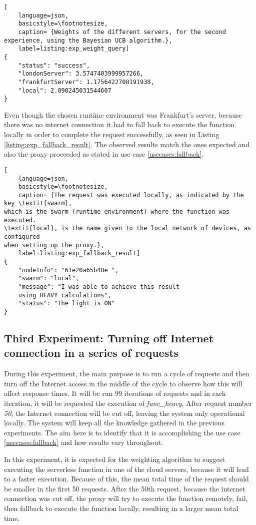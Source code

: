 \begin{lstlisting}[
    language=json,
    basicstyle=\footnotesize,
    caption= {Weights of the different servers, for the second experience, using the Bayesian UCB algorithm.},
    label=listing:exp_weight_query]
{
    "status": "success",
    "londonServer": 3.5747403999957266,
    "frankfurtServer": 1.1756422708191938,
    "local": 2.090245031544607
}
\end{lstlisting}

Even though the chosen runtime environment was Frankfurt's server, because there
was no internet connection it had to fall back to execute the function locally in
order to complete the request successfully, as seen in Listing
\ref{listing:exp_fallback_result}. The observed results match the ones expected
and also the proxy proceeded as stated in use case \ref{usecases:fallback}.

\begin{lstlisting}[
    language=json,
    basicstyle=\footnotesize,
    caption= {The request was executed locally, as indicated by the key \textit{swarm},
which is the swarm (runtime environment) where the function was executed.
\textit{local}, is the name given to the local network of devices, as configured
when setting up the proxy.},
    label=listing:exp_fallback_result]
{
    "nodeInfo": "61e20a65b48e ",
    "swarm": "local",
    "message": "I was able to achieve this result 
    using HEAVY calculations",
    "status": "The light is ON"
}
\end{lstlisting}


\subsection{Third Experiment: Turning off Internet connection in a series of requests}
During this experiment, the main purpose is to run a cycle of requests and then
turn off the Internet access in the middle of the cycle to observe how this will
affect response times. It will be run 99 iterations of requests and in each
iteration, it will be requested the execution of \textit{func\_heavy}, After
request number \textit{50}, the Internet connection will be cut off, leaving the
system only operational locally. The system will keep all the knowledge gathered
in the previous experiments. The aim here is to identify that it is accomplishing
the use case \ref{usecases:fallback} and how results vary throughout.

In this experiment, it is expected for the weighting algorithm to suggest
executing the serverless function in one of the cloud servers, because it will
lead to a faster execution. Because of this, the mean total time of the request should
be smaller in the first 50 requests. After the 50th request, because the internet
connection was cut off, the proxy will try to execute the function remotely, fail,
then fallback to execute the function locally, resulting in a larger mean total
time. 

